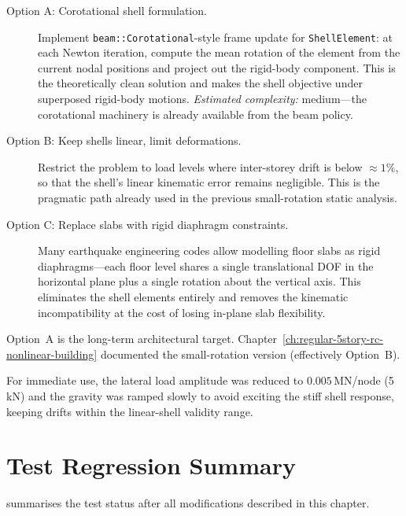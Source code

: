 \begin{description}
  \item[Option A: Corotational shell formulation.]
    Implement \texttt{beam::Corotational}-style frame update for
    \texttt{ShellElement}: at each Newton iteration, compute the
    mean rotation of the element from the current nodal positions and
    project out the rigid-body component.  This is the theoretically
    clean solution and makes the shell objective under superposed
    rigid-body motions.
    \emph{Estimated complexity:} medium---the corotational machinery
    is already available from the beam policy.

  \item[Option B: Keep shells linear, limit deformations.]
    Restrict the problem to load levels where inter-storey drift is
    below $\approx\!1\%$, so that the shell's linear kinematic error
    remains negligible.  This is the pragmatic path already used in the
    previous small-rotation static analysis.

  \item[Option C: Replace slabs with rigid diaphragm constraints.]
    Many earthquake engineering codes allow modelling floor slabs as
    rigid diaphragms---each floor level shares a single translational
    DOF in the horizontal plane plus a single rotation about the
    vertical axis.  This eliminates the shell elements entirely and
    removes the kinematic incompatibility at the cost of losing in-plane
    slab flexibility.
\end{description}

Option~A is the long-term architectural target.
Chapter~\ref{ch:regular-5story-rc-nonlinear-building} documented the
small-rotation version (effectively Option~B).

For immediate use, the lateral load amplitude was reduced to
$0.005$\,MN/node (5\,kN) and the gravity was ramped slowly to
avoid exciting the stiff shell response, keeping drifts within the
linear-shell validity range.

\section{Test Regression Summary}
\label{sec:corot-test-regression}

 summarises the test status after all
modifications described in this chapter.

